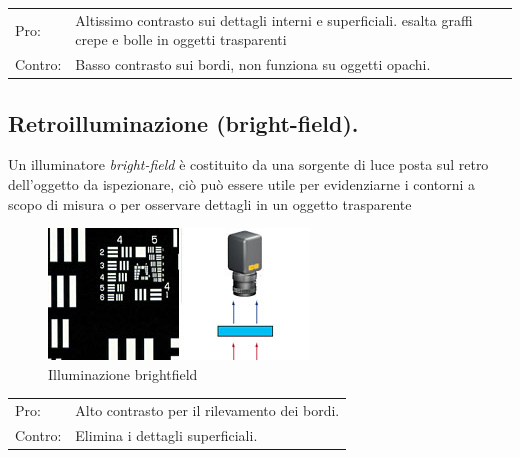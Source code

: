 \begin{centering}

\begin{tabularx}{\textwidth}{l p{}}
Pro: &  Altissimo contrasto sui dettagli interni e superficiali. esalta graffi crepe e bolle in oggetti trasparenti \\
Contro: &  Basso contrasto sui bordi, non funziona su oggetti opachi.\\
\end{tabularx}
\end{centering}

\subsection{Retroilluminazione (bright-field).}
Un illuminatore \emph{bright-field} è costituito da una sorgente di luce posta sul retro dell'oggetto da ispezionare,
ciò può essere utile per evidenziarne i contorni a scopo di misura o per osservare dettagli in un oggetto
trasparente 

\begin{figure}[!h]
\centering
\includegraphics[width=.3\textwidth]{img/illuminazione-brightfield.jpg}
\caption{Illuminazione brightfield}\label{fig:illuminazione-brightfield}
\end{figure}

\begin{centering}

\begin{tabularx}{\textwidth}{l p{}}
Pro: &  Alto contrasto per il rilevamento dei bordi. \\
Contro: &  Elimina i dettagli superficiali.\\
\end{tabularx}
\end{centering}

